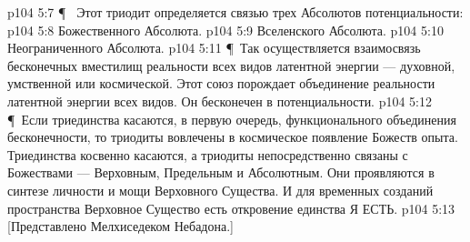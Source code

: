 \vs p104 5:7 \P\  Этот триодит определяется связью трех Абсолютов потенциальности:
\vs p104 5:8 \bibnobreakspace Божественного Абсолюта.
\vs p104 5:9 \bibnobreakspace Вселенского Абсолюта.
\vs p104 5:10 \bibnobreakspace Неограниченного Абсолюта.
\vs p104 5:11 \P\ Так осуществляется взаимосвязь бесконечных вместилищ реальности всех видов латентной энергии --- духовной, умственной или космической. Этот союз порождает объединение реальности латентной энергии всех видов. Он бесконечен в потенциальности.
\vs p104 5:12 \P\ Если триединства касаются, в первую очередь, функционального объединения бесконечности, то триодиты вовлечены в космическое появление Божеств опыта. Триединства косвенно касаются, а триодиты непосредственно связаны с Божествами --- Верховным, Предельным и Абсолютным. Они проявляются в синтезе личности и мощи Верховного Существа. И для временных созданий пространства Верховное Существо есть откровение единства Я ЕСТЬ.
\vs p104 5:13 [Представлено Мелхиседеком Небадона.]
